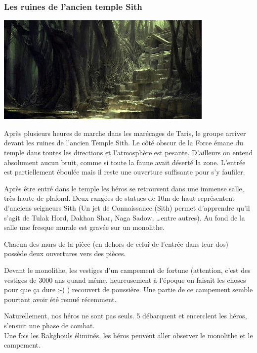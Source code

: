 \subsubsection{Les ruines de l’ancien temple Sith}
\noindent\includegraphics[width=\linewidth]{_img/places/taris-temple-sith.jpg}

Après plusieurs heures de marche dans les marécages de Taris, le groupe arriver devant les ruines de l’ancien Temple Sith. Le côté obscur de la Force émane du temple dans toutes les directions et l’atmosphère est pesante. D’ailleurs on entend absolument aucun bruit, comme si toute la faune avait déserté la zone. L’entrée est partiellement éboulée mais il reste une ouverture suffisante pour s’y faufiler.

Après être entré dans le temple les héros se retrouvent dans une immense salle, très haute de plafond. Deux rangées de statues de 10m de haut représentent d’anciens seigneurs Sith (Un jet de Connaissance (Sith) permet d’apprendre qu’il s’agit de Tulak Hord, Dakhan Shar, Naga Sadow, \ldots entre autres). Au fond de la salle une fresque murale est gravée sur un monolithe.

Chacun des murs de la pièce (en dehors de celui de l’entrée dans leur dos) possède deux ouvertures vers des pièces.

Devant le monolithe, les vestiges d’un campement de fortune (attention, c’est des vestiges de 3000 ans quand même, heureusement à l’époque on faisait les choses pour que ça dure ;-) ) recouvert de poussière. Une partie de ce campement semble pourtant avoir été remué récemment.

Naturellement, nos héros ne sont pas seuls. 5  débarquent et encerclent les héros, s’ensuit une phase de combat.
\\

Une fois les Rakghouls éliminés, les héros peuvent aller observer le monolithe et le campement.
\\

